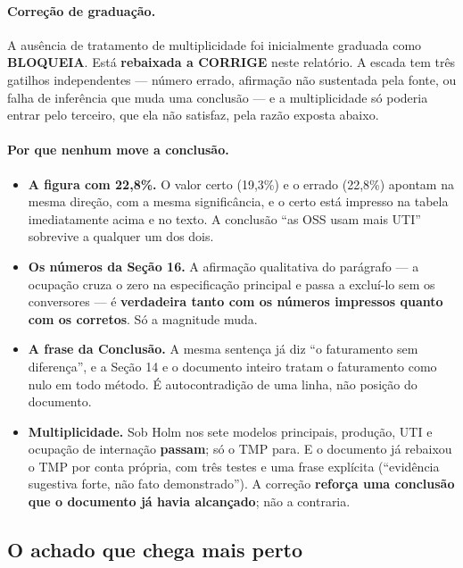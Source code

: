 \documentclass[12pt,a4paper]{article}
\newcommand{\bloqueia}{\textcolor{corbloqueia}{\textbf{BLOQUEIA}}}
\newcommand{\corrige}{\textcolor{corcorrige}{\textbf{CORRIGE}}}
\begin{document}
\paragraph{Correção de graduação.} A ausência de tratamento de
multiplicidade foi inicialmente graduada como \bloqueia{}. Está
\textbf{rebaixada a \corrige{}} neste relatório. A escada tem três
gatilhos independentes --- número errado, afirmação não sustentada pela
fonte, ou falha de inferência que muda uma conclusão --- e a
multiplicidade só poderia entrar pelo terceiro, que ela não satisfaz,
pela razão exposta abaixo.

\paragraph{Por que nenhum move a conclusão.}

\begin{itemize}[leftmargin=*]
\item \textbf{A figura com 22,8\%.} O valor certo (19,3\%) e o errado
  (22,8\%) apontam na mesma direção, com a mesma significância, e o
  certo está impresso na tabela imediatamente acima e no texto. A
  conclusão ``as OSS usam mais UTI'' sobrevive a qualquer um dos dois.
\item \textbf{Os números da Seção 16.} A afirmação qualitativa do
  parágrafo --- a ocupação cruza o zero na especificação principal e
  passa a excluí-lo sem os conversores --- é \textbf{verdadeira tanto com
  os números impressos quanto com os corretos}. Só a magnitude muda.
\item \textbf{A frase da Conclusão.} A mesma sentença já diz ``o
  faturamento sem diferença'', e a Seção 14 e o documento inteiro
  tratam o faturamento como nulo em todo método. É autocontradição de
  uma linha, não posição do documento.
\item \textbf{Multiplicidade.} Sob Holm nos sete modelos principais,
  produção, UTI e ocupação de internação \textbf{passam}; só o TMP para.
  E o documento já rebaixou o TMP por conta própria, com três testes e
  uma frase explícita (``evidência sugestiva forte, não fato
  demonstrado''). A correção \textbf{reforça uma conclusão que o
  documento já havia alcançado}; não a contraria.
\end{itemize}

\subsection*{O achado que chega mais perto}
\end{document}
